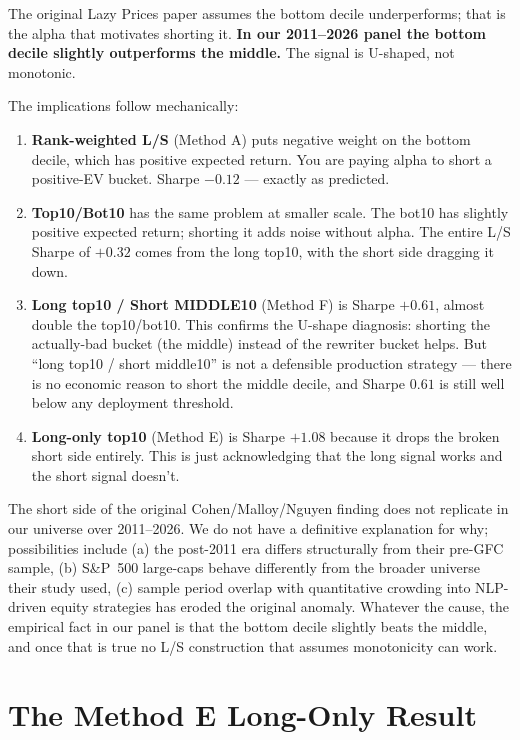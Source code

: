 \documentclass[11pt,a4paper]{article}
\begin{document}
The original Lazy Prices paper assumes the bottom decile underperforms; that is the alpha that motivates shorting it. \textbf{In our 2011--2026 panel the bottom decile slightly outperforms the middle.} The signal is U-shaped, not monotonic.

The implications follow mechanically:

\begin{enumerate}[noitemsep]
    \item \textbf{Rank-weighted L/S} (Method A) puts negative weight on the bottom decile, which has positive expected return. You are paying alpha to short a positive-EV bucket. Sharpe $-0.12$ --- exactly as predicted.
    \item \textbf{Top10/Bot10} has the same problem at smaller scale. The bot10 has slightly positive expected return; shorting it adds noise without alpha. The entire L/S Sharpe of $+0.32$ comes from the long top10, with the short side dragging it down.
    \item \textbf{Long top10 / Short MIDDLE10} (Method F) is Sharpe $+0.61$, almost double the top10/bot10. This confirms the U-shape diagnosis: shorting the actually-bad bucket (the middle) instead of the rewriter bucket helps. But ``long top10 / short middle10'' is not a defensible production strategy --- there is no economic reason to short the middle decile, and Sharpe $0.61$ is still well below any deployment threshold.
    \item \textbf{Long-only top10} (Method E) is Sharpe $+1.08$ because it drops the broken short side entirely. This is just acknowledging that the long signal works and the short signal doesn't.
\end{enumerate}

The short side of the original Cohen/Malloy/Nguyen finding does not replicate in our universe over 2011--2026. We do not have a definitive explanation for why; possibilities include (a) the post-2011 era differs structurally from their pre-GFC sample, (b) S\&P~500 large-caps behave differently from the broader universe their study used, (c) sample period overlap with quantitative crowding into NLP-driven equity strategies has eroded the original anomaly. Whatever the cause, the empirical fact in our panel is that the bottom decile slightly beats the middle, and once that is true no L/S construction that assumes monotonicity can work.

\section{The Method E Long-Only Result}
\label{sec:methode}
\end{document}
